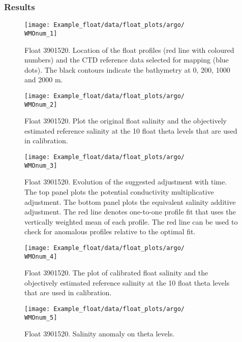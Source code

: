\documentclass{article}
\newcommand{\WMOnum}{3901520} %
\begin{document}
\begin{flushleft}
\subsubsection{Results}\label{results_ARGO}
\begin{figure}[H]
    \centering    
    \texttt{[image: Example\_float/data/float\_plots/argo/\\WMOnum\_1]}
    \caption{Float \WMOnum. Location of the float profiles (red line with coloured numbers) and the CTD reference data selected for mapping (blue dots). The black contours indicate the bathymetry at 0, 200, 1000 and 2000 m.}
    \label{trajectoryCTD_Argo}
\end{figure}
\begin{figure}[H]
    \centering    
    \texttt{[image: Example\_float/data/float\_plots/argo/\\WMOnum\_2]}
    \caption{Float \WMOnum. Plot the original float salinity and the objectively estimated reference salinity at the 10 float theta levels that are used in calibration.}
    \label{uncalibVsSalinity_Argo}
\end{figure}
\begin{figure}[H]
    \centering    
    \texttt{[image: Example\_float/data/float\_plots/argo/\\WMOnum\_3]}
    \caption{Float \WMOnum. Evolution of the suggested adjustment with time. The top panel plots the potential conductivity multiplicative adjustment. The bottom panel plots the equivalent salinity additive adjustment. The red line denotes one-to-one profile fit that uses the vertically weighted mean of each profile. The red line can be used to check for anomalous profiles relative to the optimal fit.}
    \label{SalWithErrors_Argo}
\end{figure}
\begin{figure}[H]
    \centering    
    \texttt{[image: Example\_float/data/float\_plots/argo/\\WMOnum\_4]}
    \caption{Float \WMOnum. The plot of calibrated float salinity and the objectively estimated reference salinity at the 10 float theta levels that are used in calibration.}
    \label{CalibVsSalinity_Argo}
\end{figure}
\begin{figure}[H]
    \centering    
    \texttt{[image: Example\_float/data/float\_plots/argo/\\WMOnum\_5]}
    \caption{Float \WMOnum. Salinity anomaly on theta levels.}

\end{figure}
\end{flushleft}
\end{document}
